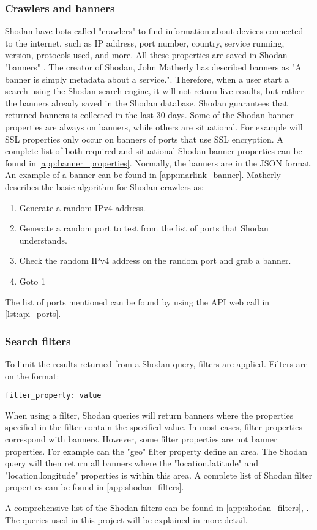 \subsubsection{Crawlers and banners}
Shodan have bots called "crawlers" to find information about devices connected to the internet, such as IP address, port number, country, service running, version, protocols used, and more. 
All these properties are saved in Shodan "banners" . The creator of Shodan, John Matherly has described banners as "A banner is simply metadata about a service.". \cite{banner} 
Therefore, when a user start a search using the Shodan search engine, it will not return live results, but rather the banners already saved in the Shodan database. Shodan guarantees that returned banners is collected in the last 30 days.\cite{matherly_guide_to_shodan}
Some of the Shodan banner properties are always on banners, while others are situational. For example will SSL properties only occur on banners of ports that use SSL encryption. A complete list of both required and situational Shodan banner properties can be found in \cref{app:banner_properties}.
Normally, the banners are in the JSON format. An example of a banner can be found in \cref{app:marlink_banner}.
Matherly\cite{matherly_guide_to_shodan} describes the basic algorithm for Shodan crawlers as:
\begin{enumerate}
\setlength\itemsep{0em}
	\item Generate a random IPv4 address. 
	\item Generate a random port to test from the list of ports that Shodan understands.
	\item Check the random IPv4 address on the random port and grab a banner.
	\item Goto 1
\end{enumerate}
The list of ports mentioned can be found by using the API web call in \cref{lst:api_ports}.


\subsubsection{Search filters} \label{sec:filters}
To limit the results returned from a Shodan query, filters are applied. Filters are on the format:
\begin{lstlisting}
filter_property: value
\end{lstlisting}
When using a filter, Shodan queries will return banners where the properties specified in the filter contain the specified value. In most cases, filter properties correspond with banners. However, some filter properties are not banner properties. For example can the "geo" filter property define an area. The Shodan query will then return all banners where the "location.latitude" and "location.longitude" properties is within this area. A complete list of Shodan filter properties can be found in \cref{app:shodan_filters}.

A comprehensive list of the Shodan filters can be found in \cref{app:shodan_filters}, . The queries used in this project will be explained in more detail. 

\newpage

